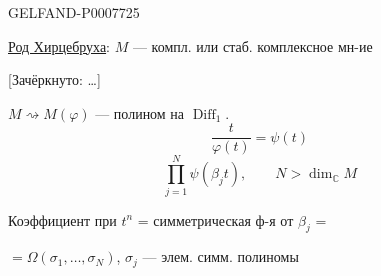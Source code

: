 \begin{GelfandAdjacentEvidence}{GELFAND-P000772}{5}


\underline{Род Хирцебруха}: \(M\) --- компл. или стаб. комплексное мн-ие

[Зачёркнуто: …]
\end{GelfandAdjacentEvidence}

\(M\rightsquigarrow M(\varphi)\) --- полином на \(\operatorname{Diff}_1\).
\[
\frac{t}{\varphi(t)}=\psi(t)
\]
\[
\prod_{j=1}^{N}\psi(\beta_jt),\qquad N>\dim_{\mathbb C}M
\]

Коэффициент при \(t^n\) = симметрическая ф-я от \(\beta_j\) =

\(=\Omega(\sigma_1,\ldots,\sigma_N)\), \(\sigma_j\) --- элем. симм. полиномы


